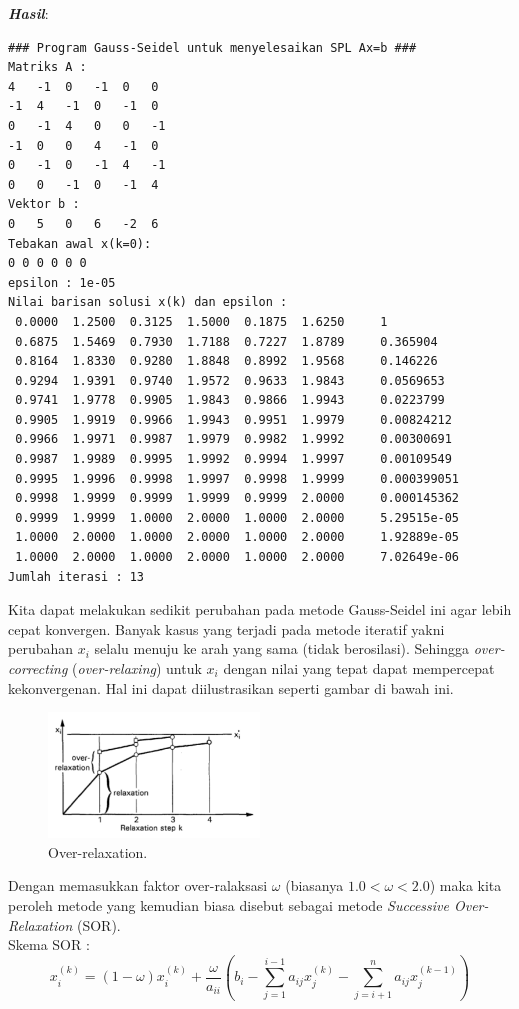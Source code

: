 \documentclass[paper=a4, fontsize=11pt]{scrartcl}
\numberwithin{equation}{section} %
\numberwithin{figure}{section} %
\numberwithin{table}{section} %
\begin{document}
\textit{\textbf{Hasil}}:
\begin{small}
\begin{verbatim}
### Program Gauss-Seidel untuk menyelesaikan SPL Ax=b ###
Matriks A : 
4	-1	0	-1	0	0	
-1	4	-1	0	-1	0	
0	-1	4	0	0	-1	
-1	0	0	4	-1	0	
0	-1	0	-1	4	-1	
0	0	-1	0	-1	4	
Vektor b : 
0	5	0	6	-2	6	
Tebakan awal x(k=0): 
0 0 0 0 0 0 
epsilon : 1e-05
Nilai barisan solusi x(k) dan epsilon : 
 0.0000  1.2500  0.3125  1.5000  0.1875  1.6250 	1
 0.6875  1.5469  0.7930  1.7188  0.7227  1.8789 	0.365904
 0.8164  1.8330  0.9280  1.8848  0.8992  1.9568 	0.146226
 0.9294  1.9391  0.9740  1.9572  0.9633  1.9843 	0.0569653
 0.9741  1.9778  0.9905  1.9843  0.9866  1.9943 	0.0223799
 0.9905  1.9919  0.9966  1.9943  0.9951  1.9979 	0.00824212
 0.9966  1.9971  0.9987  1.9979  0.9982  1.9992 	0.00300691
 0.9987  1.9989  0.9995  1.9992  0.9994  1.9997 	0.00109549
 0.9995  1.9996  0.9998  1.9997  0.9998  1.9999 	0.000399051
 0.9998  1.9999  0.9999  1.9999  0.9999  2.0000 	0.000145362
 0.9999  1.9999  1.0000  2.0000  1.0000  2.0000 	5.29515e-05
 1.0000  2.0000  1.0000  2.0000  1.0000  2.0000 	1.92889e-05
 1.0000  2.0000  1.0000  2.0000  1.0000  2.0000 	7.02649e-06
Jumlah iterasi : 13
\end{verbatim}
\end{small}

\vspace{1cm}
Kita dapat melakukan sedikit perubahan pada metode Gauss-Seidel ini agar lebih cepat konvergen. Banyak kasus yang terjadi pada metode iteratif yakni perubahan $x_{i}$ selalu menuju ke arah yang sama (tidak berosilasi). Sehingga \textit{over-correcting} (\textit{over-relaxing}) untuk $x_{i}$ dengan nilai yang tepat dapat mempercepat kekonvergenan. Hal ini dapat diilustrasikan seperti gambar di bawah ini.

\begin{figure}
	\centering
	\includegraphics[width=0.5\textwidth]
		{sor.png}
	\caption{Over-relaxation.}
	\label{fig:sor}
\end{figure}

Dengan memasukkan faktor over-ralaksasi $\omega $ (biasanya $1.0<\omega<2.0$) maka kita peroleh metode yang kemudian biasa disebut sebagai metode \textit{Successive Over-Relaxation} (SOR).\\
Skema SOR :
\begin{equation}
x_{i}^{(k)} = (1 - \omega)x_{i}^{(k)} + \frac{\omega}{a_{ii}}\left(b_{i} -\sum_{j=1}^{i-1}a_{ij}x_{j}^{(k)} -\sum_{j=i+1}^{n}a_{ij}x_{j}^{(k-1)}\right)
\end{equation}
\end{document}
